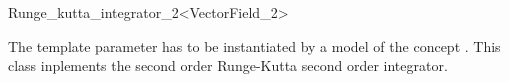 

\begin{ccRefFunctionObjectClass}{Runge_kutta_integrator_2<VectorField_2>}  %

\ccDefinition

The template parameter  has to
be instantiated by a model of the concept . This class inplements the second order Runge-Kutta second order integrator.



\ccIsModel 

 \\

\ccSeeAlso
{} \\
\end{ccRefFunctionObjectClass}


